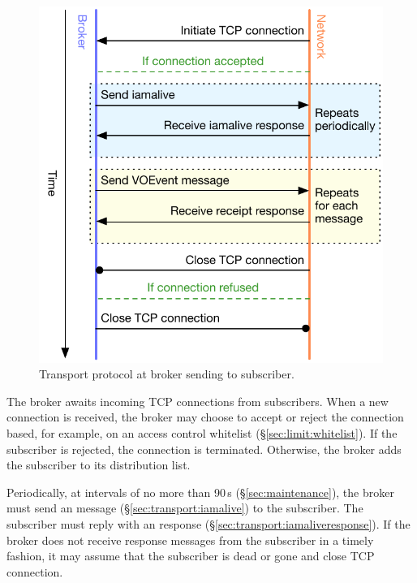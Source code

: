 \documentclass[a4paper,11pt]{ivoa}
\begin{document}
\begin{figure}
  \begin{center}
  \includegraphics{figures/brokertosub.pdf}
  \end{center}

  \caption{Transport protocol at broker sending to subscriber.}

  \label{fig:protocol:brokertosub}
\end{figure}

The broker awaits incoming TCP connections from subscribers. When a new
connection is received, the broker may choose to accept or reject the
connection based, for example, on an access control whitelist
(\S\ref{sec:limit:whitelist}). If the subscriber is rejected, the connection
is terminated. Otherwise, the broker adds the subscriber to its distribution
list.

Periodically, at intervals of no more than 90\,s (\S\ref{sec:maintenance}),
the broker must send an  message
(\S\ref{sec:transport:iamalive}) to the subscriber. The subscriber must reply
with an  response (\S\ref{sec:transport:iamaliveresponse}).
If the broker does not receive  response messages from the
subscriber in a timely fashion, it may assume that the subscriber is dead or
gone and close TCP connection.
\end{document}
